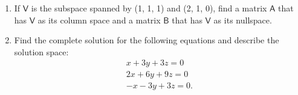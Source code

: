 \documentclass[a4paper, 11pt]{article}
\newcommand{\mat}[1]{\boldsymbol { \mathsf{#1}} }
\begin{document}
\begin{enumerate}
\item If $\mat V$ is the subspace spanned by (1, 1, 1) and (2, 1, 0), find a matrix $\mat A$ that has $\mat V$ as its column space and a matrix $\mat B$ that has $\mat V$ as its nullspace.

\item Find the complete solution for the following equations and describe the solution space:
\begin{equation} \label{eq1}
\begin{split}
x + 3y + 3z  = 0\\
2x + 6y + 9z = 0\\
-x - 3y +3z  = 0.
\end{split}
\end{equation}
\end{enumerate}
\end{document}
